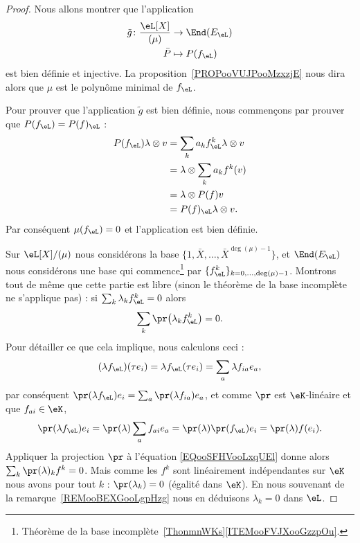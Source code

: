 \begin{proof}
    Nous allons montrer que l'application
    \begin{equation}
        \begin{aligned}
            \tilde g\colon \frac{ \eL[X] }{ (\mu) }&\to \End(E_{\eL}) \\
            \bar P&\mapsto P(f_{\eL})
        \end{aligned}
    \end{equation}
    est bien définie et injective. La proposition~\ref{PROPooVUJPooMzxzjE} nous dira alors que \( \mu\) est le polynôme minimal de \( f_{\eL}\).

    Pour prouver que l'application \( \tilde g\) est bien définie, nous commençons par prouver que  \( P(f_{\eL})=P(f)_{\eL}\) :
    \begin{subequations}
        \begin{align}
            P(f_{\eL})\lambda\otimes v&=\sum_ka_kf_{\eL}^k\lambda\otimes v\\
            &=\lambda\otimes \sum_ka_kf^k(v)\\
            &=\lambda\otimes P(f)v\\
            &=P(f)_{\eL}\lambda\otimes v.
        \end{align}
    \end{subequations}
    Par conséquent \( \mu(f_{\eL})=0\) et l'application est bien définie.

    Sur \( \eL[X]/(\mu)\) nous considérons la base \( \{ 1,\bar X,\ldots, \bar X^{\deg(\mu)-1} \}\), et \( \End(E_{\eL})\) nous considérons une base qui commence\footnote{Théorème de la base incomplète~\ref{ThonmnWKs}\ref{ITEMooFVJXooGzzpOu}.} par \( \{ f_{\eL}^k \}_{k=0,\ldots, \deg(\mu)-1}\). Montrons tout de même que cette partie est libre (sinon le théorème de la base incomplète ne s'applique pas) : si \( \sum_k\lambda_kf_{\eL}^k=0\) alors
    \begin{equation}        \label{EQooSFHVooLxqUEl}
        \sum_k\pr\big( \lambda_k f_{\eL}^k\big)=0.
    \end{equation}
    Pour détailler ce que cela implique, nous calculons ceci :
    \begin{equation}
        (\lambda f_{\eL})(\tau e_i)=\lambda f_{\eL}(\tau e_i)=\sum_a \lambda f_{ia}e_a,
    \end{equation}
    par conséquent \( \pr(\lambda f_{\eL})e_i=\sum_a\pr(\lambda f_{ia})e_a\), et comme \( \pr\) est \( \eK\)-linéaire et que \( f_{ai}\in \eK\),
    \begin{equation}
        \pr(\lambda f_{\eL})e_i=\pr(\lambda)\sum_a f_{ai}e_a=\pr(\lambda)\pr(f_\eL)e_i=\pr(\lambda)f(e_i).
    \end{equation}
    Appliquer la projection \( \pr\) à l'équation \eqref{EQooSFHVooLxqUEl} donne alors \( \sum_k\pr(\lambda)_kf^k=0\). Mais comme les \( f^k\) sont linéairement indépendantes sur \( \eK\) nous avons pour tout \( k\) : \( \pr(\lambda_k)=0\) (égalité dans \( \eK\)). En nous souvenant de la remarque~\ref{REMooBEXGooLgpHzg} nous en déduisons \( \lambda_k=0\) dans \( \eL\).


\end{proof}
